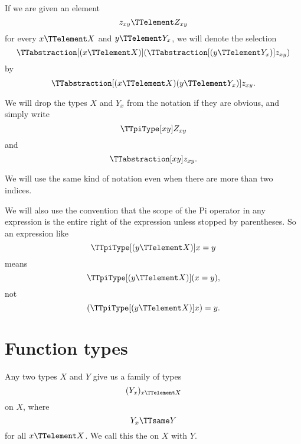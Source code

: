 \documentclass{article}
\begin{document}
If we are given an element
\begin{equation*}
  z_{xy} \TTelement Z_{xy}
\end{equation*}
for every $x \TTelement X$ and $y \TTelement Y_x$, we will denote the
selection
\begin{equation*}
  \TTabstraction[(x \TTelement X)]
  (\TTabstraction[(y \TTelement Y_x)] z_{xy})
\end{equation*}
by
\begin{equation*}
  \TTabstraction[(x \TTelement X) (y \TTelement Y_x)] z_{xy}.
\end{equation*}

We will drop the types $X$ and $Y_x$ from the notation if they are
obvious, and simply write
\begin{equation*}
  \TTpiType[x y] Z_{xy}
\end{equation*}
and
\begin{equation*}
  \TTabstraction[x y] z_{xy}.
\end{equation*}

We will use the same kind of notation even when there are more than
two indices.

We will also use the convention that the scope of the Pi operator in
any expression is the entire right of the expression unless stopped by
parentheses.  So an expression like
\begin{equation*}
  \TTpiType[(y \TTelement X)] x = y
\end{equation*}
means
\begin{equation*}
  \TTpiType[(y \TTelement X)] (x = y),
\end{equation*}
not
\begin{equation*}
  (\TTpiType[(y \TTelement X)] x) = y.
\end{equation*}

\section{Function types}
\label{sec:function-types}

Any two types $X$ and $Y$ give us a family of types
\begin{equation*}
  (Y_x)_{x \TTelement X}
\end{equation*}
on $X$, where
\begin{equation*}
  Y_x \TTsame Y
\end{equation*}
for all $x \TTelement X$.  We call this the  on $X$ with  $Y$.
\end{document}
